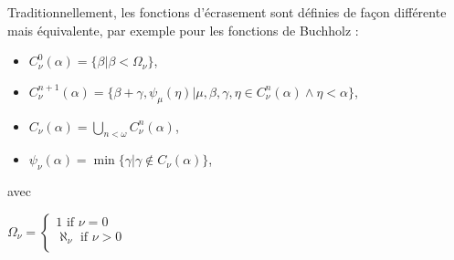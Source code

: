 \documentclass[12pt]{beamer}
\begin{document}
\begin{frame}

\small 

Traditionnellement, les fonctions d'écrasement sont définies de façon différente mais équivalente, par exemple pour les fonctions de Buchholz :

\begin{itemize}
     \setlength{\itemsep}{1pt}
     \setlength{\parskip}{0pt}
     \setlength{\parsep}{0pt}
\item \(C_\nu^0(\alpha) = \{\beta|\beta<\Omega_\nu\}\),
\item \(C_\nu^{n+1}(\alpha) = \{\beta+\gamma,\psi_\mu(\eta)|\mu,\beta, \gamma,\eta\in C_{\nu}^n(\alpha)\wedge\eta<\alpha\}\),
\item \(C_\nu(\alpha) = \bigcup_{n < \omega} C_\nu^n (\alpha)\),
\item \(\psi_\nu(\alpha) = \min\{\gamma | \gamma \not\in C_\nu(\alpha)\}\),
\end{itemize}

avec 

\(\Omega_\nu=\left\{\begin{array}{lcr} 1\text{ if }\nu=0\\ \aleph_\nu\text{ if }\nu>0\\ \end{array}\right.\)

\end{frame}
\end{document}
